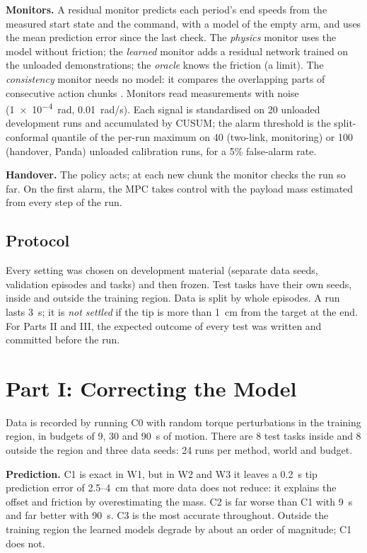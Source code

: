 \documentclass[conference]{IEEEtran}
\newcommand{\Cz}{C0}
\newcommand{\Co}{C1}
\newcommand{\Ct}{C2}
\newcommand{\Cr}{C3}
\begin{document}
\textbf{Monitors.} A residual monitor predicts each period's end speeds from the measured start state and the command, with a model of the empty arm, and uses the mean prediction error since the last check. The \emph{physics} monitor uses the model without friction; the \emph{learned} monitor adds a residual network trained on the unloaded demonstrations; the \emph{oracle} knows the friction (a limit). The \emph{consistency} monitor needs no model: it compares the overlapping parts of consecutive action chunks \cite{agia2024sentinel}. Monitors read measurements with noise (\SI{1e-4}{rad}, \SI{0.01}{rad/s}). Each signal is standardised on 20 unloaded development runs and accumulated by CUSUM; the alarm threshold is the split-conformal quantile of the per-run maximum on 40 (two-link, monitoring) or 100 (handover, Panda) unloaded calibration runs, for a 5\% false-alarm rate.

\textbf{Handover.} The policy acts; at each new chunk the monitor checks the run so far. On the first alarm, the MPC takes control with the payload mass estimated from every step of the run.

\subsection{Protocol}

Every setting was chosen on development material (separate data seeds, validation episodes and tasks) and then frozen. Test tasks have their own seeds, inside and outside the training region. Data is split by whole episodes. A run lasts \SI{3}{s}; it is \emph{not settled} if the tip is more than \SI{1}{cm} from the target at the end. For Parts II and III, the expected outcome of every test was written and committed before the run.

\section{Part I: Correcting the Model}
\label{sec:part1}

Data is recorded by running \Cz{} with random torque perturbations in the training region, in budgets of 9, 30 and \SI{90}{s} of motion. There are 8 test tasks inside and 8 outside the region and three data seeds: 24 runs per method, world and budget.

\textbf{Prediction.} \Co{} is exact in W1, but in W2 and W3 it leaves a \SI{0.2}{s} tip prediction error of 2.5--\SI{4}{cm} that more data does not reduce: it explains the offset and friction by overestimating the mass. \Ct{} is far worse than \Co{} with \SI{9}{s} and far better with \SI{90}{s}. \Cr{} is the most accurate throughout. Outside the training region the learned models degrade by about an order of magnitude; \Co{} does not.
\end{document}
